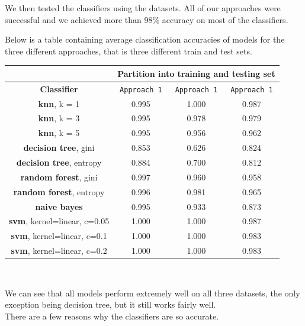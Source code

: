 \documentclass[12pt,a4paper]{article}
\begin{document}
    We then tested the classifiers using the datasets. All of our approaches were successful and we achieved more than 98\% accuracy on most of the classifiers. 

    Below is a table containing average classification accuracies of models for the three different approaches, that is three different train and test sets.

    \begin{center}
        \begin{tabular}{|c|c|c|c|}
            \hline
			 & \multicolumn{3}{c|}{\textbf{Partition into training and testing set}} \\
			\hline 
			\textbf{Classifier} & \texttt{Approach 1} & \texttt{Approach 1} & \texttt{Approach 1} \\
            \hline \hline
            
			\textbf{knn}, \small k = 1 & 0.995 & 1.000 & 0.987 \\
			\textbf{knn}, \small k = 3 & 0.995 & 0.978 & 0.979 \\
			\textbf{knn}, \small k = 5 & 0.995 & 0.956 & 0.962 \\
			\hline \hline
			\textbf{decision tree}, \small gini & 0.853 & 0.626 & 0.824 \\
			\textbf{decision tree}, \small entropy & 0.884 & 0.700 & 0.812 \\
			\hline \hline
			\textbf{random forest}, \small gini & 0.997 & 0.960 & 0.958 \\
			\textbf{random forest}, \small entropy & 0.996 & 0.981 & 0.965 \\
			\hline \hline
			\textbf{naive bayes} & 0.995 & 0.933 & 0.873 \\
			\hline \hline
			\textbf{svm}, \small kernel=linear, c=0.05 & 1.000 & 1.000 & 0.987 \\
			\textbf{svm}, \small kernel=linear, c=0.1 & 1.000 & 1.000 & 0.983 \\
			\textbf{svm}, \small kernel=linear, c=0.2 & 1.000 & 1.000 & 0.983 \\
			\hline
		\end{tabular} \\
    \end{center}

    We can see that all models perform extremely well on all three datasets, the only exception being decision tree, but it still works fairly well. \\

    There are a few reasons why the classifiers are so accurate.
\end{document}
